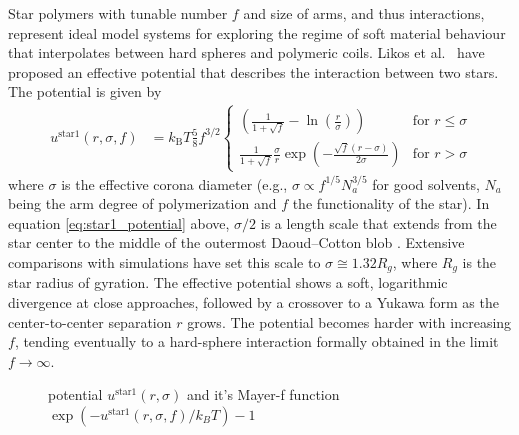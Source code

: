 Star polymers with tunable number $f$ and size of arms, and thus interactions,
represent ideal model systems for exploring the regime of soft material behaviour that
interpolates between hard spheres and polymeric coils.
Likos et al.\ \cite{Likos1998,Likos2001} have proposed an effective potential that describes
the interaction between two stars. The potential is given by
\begin{align}\
\label{eq:star1_potential}
u^\text{star1}(r,\sigma,f) &=
k_\text{B} T \frac{5}{8} f^{3/2}
\begin{cases}
\left(\frac{1}{1+\sqrt{f}}-\ln\left(\frac{r}{\sigma}\right) \right)
          & \mbox{for } r \leq \sigma \\
\frac{1}{1+\sqrt{f}} \frac{\sigma}{r}
\exp\left(-\frac{\sqrt{f} (r-\sigma)}{2\sigma}\right)
          & \mbox{for } r >    \sigma
\end{cases}
\end{align}
where $\sigma$ is the effective corona diameter
(e.g., $\sigma \propto f^{1/5} N_a^{3/5}$ for good
solvents, $N_a$ being the arm degree of polymerization and $f$ the functionality of the star).
In equation \ref{eq:star1_potential} above, $\sigma/2$ is a length scale that extends from the
star center to the middle of the outermost Daoud–Cotton
blob \cite{Likos2006}. Extensive comparisons with simulations have
set this scale to $\sigma \cong 1.32R_g$, where $R_g$ is the star radius of
gyration. The effective potential shows a soft, logarithmic
divergence at close approaches, followed by a crossover to a
Yukawa form as the center-to-center separation $r$ grows. The
potential becomes harder with increasing $f$, tending eventually to a hard-sphere
interaction formally obtained in the limit $f\rightarrow\infty$.

\begin{figure}[htb]
\centering
  \quad
  \caption{potential $u^\text{star1}(r,\sigma)$ and it's Mayer-f function $\exp(-u^\text{star1}(r,\sigma,f)/k_BT)-1$}
\end{figure}

